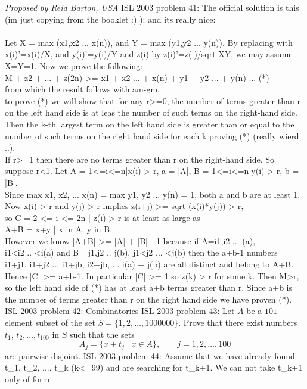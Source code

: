\textit{Proposed by Reid Barton, USA} 
ISL 2003 problem 41:  The official solution is this (im just copying from the booklet :) ): and its really nice: \\\\
Let X = max (x1,x2 ... x(n)), and Y = max (y1,y2 ... y(n)). By replacing with \\
x(i)'=x(i)/X, and y(i)'=y(i)/Y and z(i) by z(i)'=z(i)/sqrt XY, we may assume \\
X=Y=1. Now we prove the following: \\
M + z2 + ... + z(2n) >= x1 + x2 ... + x(n) + y1 + y2 ... + y(n) ... (*) \\
from which the result follows with am-gm. \\
to prove (*) we will show that for any r>=0, the number of terms greater than r on the left hand side is at leas the number of such terms on the right-hand side. Then the k-th largest term on the left hand side is greater than or equal to the number of such terms on the right hand side for each k proving (*) (really wierd ..). \\
If r>=1 then there are no terms greater than r on the right-hand side. So suppose r<1. Let A = {1<=i<=n|x(i) > r}, a = |A|, B = {1<=i<=n|y(i) > r}, b = |B|. \\
Since max { x1, x2, ... x(n)} = max {y1, y2 ... y(n)} = 1, both a and b are at least 1. Now x(i) > r and y(j) > r implies z(i+j) >= sqrt (x(i)*y(j)) > r, \\
so C = {2 <= i <= 2n | z(i) > r} is at least as large as \\
A+B = {x+y | x in A, y in B}. \\
However we know |A+B| >= |A| + |B| - 1 because if A={i1,i2 .. i(a)}, \\
i1<i2 .. <i(a) and B ={j1,j2 .. j(b)}, j1<j2 ... <j(b) then the a+b-1 numbers \\
i1+j1, i1+j2 ... i1+jb, i2+jb, ... i(a) + j(b) are all distinct and belong to A+B. \\
Hence |C| >= a+b-1. In particular |C| >= 1 so z(k) > r for some k. Then M>r, so the left hand side of (*) has at least a+b terms greater than r. Since a+b is the number of terms greater than r on the right hand side we have proven (*). 
ISL 2003 problem 42:  Combinatorics 
ISL 2003 problem 43:  Let $A$ be a $101$-element subset of the set $S=\{1,2,\ldots,1000000\}$. Prove that there exist numbers $t_1$, $t_2, \ldots, t_{100}$ in $S$ such that the sets
\[ A_j=\{x+t_j\mid x\in A\},\qquad j=1,2,\ldots,100 \]
are pairwise disjoint. 
ISL 2003 problem 44:  Assume that we have already found t_1, t_2, ..., t_k (k<=99) and are searching for t_{k+1}. We can not take t_{k+1} only of form \\
